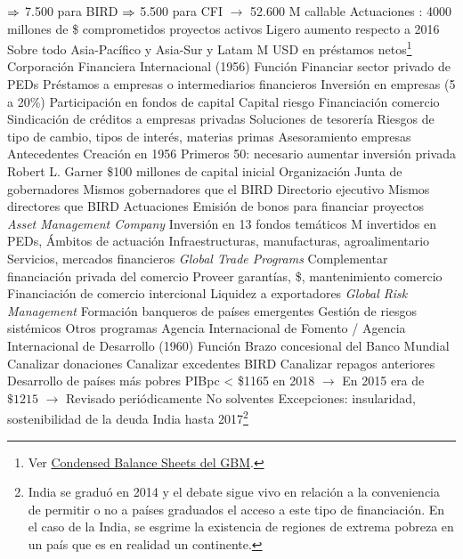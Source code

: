 \documentclass{nuevotema}
\begin{document}
\begin{esquemal}
				\4[] $\Rightarrow$ 7.500 para BIRD
				\4[] $\Rightarrow$ 5.500 para CFI
				\4[] $\to$ 52.600 M callable
			\3 Actuaciones
				: 4000 millones de \$ comprometidos proyectos activos
				\4 Ligero aumento respecto a 2016
				\4 Sobre todo Asia-Pacífico y Asia-Sur y Latam
				 M USD en préstamos netos\footnote{Ver \href{https://finances.worldbank.org/Financial-Reporting/Condensed-Balance-Sheets/54xn-mzza/data}{Condensed Balance Sheets del GBM}.}
		\2 Corporación Financiera Internacional (1956)
			\3 Función
				\4 Financiar sector privado de PEDs
				\4[] Préstamos a empresas o intermediarios financieros
				\4[] Inversión en empresas (5 a 20\%)
				\4[] Participación en fondos de capital
				\4[] Capital riesgo
				\4[] Financiación comercio
				\4[] Sindicación de créditos a empresas privadas
				\4 Soluciones de tesorería
				\4[] Riesgos de tipo de cambio, tipos de interés, materias primas
				\4 Asesoramiento empresas
			\3 Antecedentes
				\4 Creación en 1956
				\4 Primeros 50: necesario aumentar inversión privada
				\4 Robert L. Garner
				\4 \$100 millones de capital inicial
			\3 Organización
				\4 Junta de gobernadores
				\4[] Mismos gobernadores que el BIRD
				\4 Directorio ejecutivo
				\4[] Mismos directores que BIRD
			\3 Actuaciones
				\4 Emisión de bonos para financiar proyectos
				\4 \textit{Asset Management Company}
				\4[] Inversión en 13 fondos temáticos
				 M invertidos en PEDs,
				\4 Ámbitos de actuación
				\4[] Infraestructuras, manufacturas, agroalimentario
				\4[] Servicios, mercados financieros
				\4 \textit{Global Trade Programs}
				\4[] Complementar financiación privada del comercio
				\4[] Proveer garantías, \$, mantenimiento comercio
				\4[] Financiación de comercio intercional
				\4[] Liquidez a exportadores
				\4 \textit{Global Risk Management}
				\4[] Formación banqueros de países emergentes
				\4[] Gestión de riesgos sistémicos
				\4 Otros programas
		\2 Agencia Internacional de Fomento / Agencia Internacional de Desarrollo (1960)
			\3 Función
				\4 Brazo concesional del Banco Mundial
				\4[] Canalizar donaciones
				\4[] Canalizar excedentes BIRD
				\4[] Canalizar repagos anteriores
				\4 Desarrollo de países más pobres
				\4[] PIBpc < \$1165 en 2018
				\4[] $\to$ En 2015 era de $\$1215$
				\4[] $\to$ Revisado periódicamente
				\4[] No solventes
				\4[] Excepciones: insularidad, sostenibilidad de la deuda
				\4[] India hasta 2017\footnote{India se graduó en 2014 y el debate sigue vivo en relación a la conveniencia de permitir o no a países graduados el acceso a este tipo de financiación. En el caso de la India, se esgrime la existencia de regiones de extrema pobreza en un país que es en realidad un continente.}

\end{esquemal}
\end{document}
